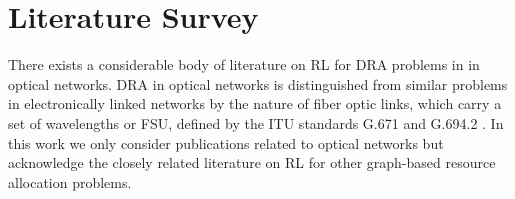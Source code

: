 \section{Literature Survey}
\label{sec:survey}

There exists a considerable body of literature on RL for DRA problems in in optical networks. %
DRA in optical networks is distinguished from similar problems in electronically linked networks by the nature of fiber optic links, which carry a set of wavelengths or FSU, defined by the ITU standards G.671 and G.694.2 \cite{international_telecommunication_union_spectral_2002,international_telecommunication_union_transmission_2012}. In this work we only consider publications related to optical networks but acknowledge the closely related literature on RL for other graph-based resource allocation problems.

